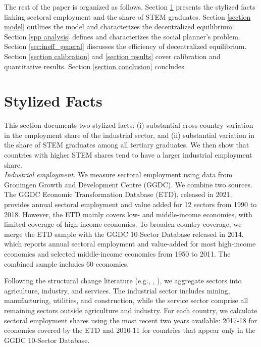\documentclass[12pt]{article} %
\theoremstyle{definition}
\begin{document}
The rest of the paper is organized as follows. Section \ref{section stylized} presents the stylized facts linking  sectoral employment and the share of STEM graduates. Section \ref{section model} outlines the model and characterizes the decentralized equilibrium. Section \ref{spp analysis} defines and characterizes the social planner's problem.   Section \ref{sec:ineff_general}  discusses the efficiency of decentralized equilibrium. Section \ref{section calibration} and \ref{section results} cover calibration and quantitative results. Section \ref{section conclusion} concludes.







\section{Stylized Facts}\label{section stylized}


This section  documents two stylized facts: (i) substantial cross-country variation in the employment share of the industrial sector, and (ii)  substantial variation in the share of STEM graduates among all  tertiary graduates. We then show that countries with higher STEM shares tend to have a larger industrial employment share.  \\

\noindent\textit{Industrial employment.}
We measure sectoral employment using data  from Groningen Growth and Development Centre (GGDC). We combine two sources. The GGDC Economic Transformation Database (ETD), released in 2021, provides annual sectoral employment and  value added for 12 sectors from 1990 to 2018. However, the ETD mainly  covers low- and middle-income economies,  with limited coverage of high-income economies. To broaden  country coverage, we merge the ETD sample with the GGDC 10-Sector Database released in 2014, which reports annual sectoral employment and value-added for most high-income economies and selected middle-income economies from 1950 to 2011. The combined sample includes 60 economies. 

Following the structural change literature (e.g., \cite{uy2013structural}, \cite*{huneeus2024heterogeneous}), we aggregate sectors into  agriculture, industry, and services. The industrial sector includes mining, manufacturing, utilities, and construction, while  the service sector comprise all remaining sectors outside agriculture and industry.  For each country, we calculate sectoral employment shares using the most recent two years available:  2017-18 for economies covered by the ETD and 2010-11 for countries that appear only in the GGDC 10-Sector Database. 
\end{document}
